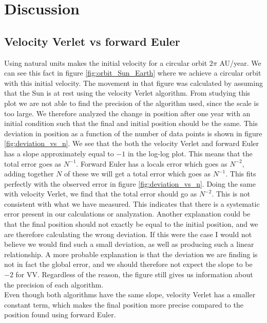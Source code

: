 \documentclass[%
 reprint,
nofootinbib,
aps,
]{revtex4-1}
\begin{document}
\section{Discussion}
\subsection{Velocity Verlet vs forward Euler}
Using natural units makes the initial velocity for a circular orbit $2\pi$ AU/year. We can see this fact in figure \vref{fig:orbit_Sun_Earth} where we achieve a circular orbit with this initial velocity. The movement in that figure was calculated by assuming that the Sun is at rest using the velocity Verlet algorithm. From studying this plot we are not able to find the precision of the algorithm used, since the scale is too large. We therefore analyzed the change in position after one year with an initial condition such that the final and initial position should be the same. This deviation in position as a function of the number of data points is shown in figure \vref{fig:deviation_vs_n}. We see that the both the velocity Verlet and forward Euler has a slope approximately equal to $-1$ in the log-log plot. This means that the total error goes as $N^{-1}$. Forward Euler has a locals error which goes as $N^{-2}$, adding together $N$ of these we will get a total error which goes as $N^{-1}$.
This fits perfectly with the observed error in figure \vref{fig:deviation_vs_n}. Doing the same with velocity Verlet, we find that the total error should go as $N^{-2}$. This is not consistent with what we have measured. This indicates that there is a systematic error present in our calculations or analyzation. Another explanation could be that the final position should not exactly be equal to the initial position, and we are therefore calculating the wrong deviation. If this were the case I would not believe we would find such a small deviation, as well as producing such a linear relationship. A more probable explanation is that the deviation we are finding is not in fact the global error, and we should therefore not expect the slope to be $-2$ for VV. Regardless of the reason, the figure still gives us information about the precision of each algorithm.
\\Even though both algorithms have the same slope, velocity Verlet has a smaller constant term, which makes the final position more precise compared to the position found using forward Euler.\\
\end{document}
